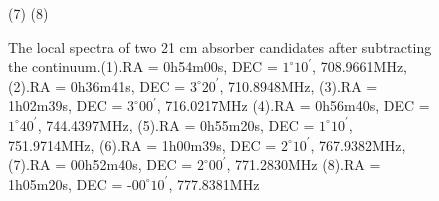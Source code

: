 \documentclass[prl,twocolumn,floatfix,superscriptaddress,nofootinbib,aps]{revtex4}
\begin{document}
\begin{figure}[h]
      \vspace{-1.2ex}
(7)
      \hspace{1.1ex}
      \vspace{-1.2ex}
(8)

      \caption{The local spectra of two 21 cm absorber candidates after subtracting the continuum.(1).RA = 0h54m00s, DEC = $1^{\circ}10^\prime$, 708.9661MHz, (2).RA = 0h36m41s, DEC = $3^{\circ}20^\prime$, 710.8948MHz, (3).RA = 1h02m39s, DEC = $3^{\circ}00^\prime$, 716.0217MHz (4).RA = 0h56m40s, DEC = $1^{\circ}40^\prime$, 744.4397MHz, (5).RA = 0h55m20s, DEC = $1^{\circ}10^\prime$, 751.9714MHz, (6).RA = 1h00m39s, DEC = $2^{\circ}10^\prime$, 767.9382MHz, (7).RA = 00h52m40s, DEC = $2^{\circ}00^\prime$, 771.2830MHz (8).RA = 1h05m20s, DEC = -$00^{\circ}10^\prime$, 777.8381MHz}
      \label{Fig.candidates}
\end{figure}
\end{document}
